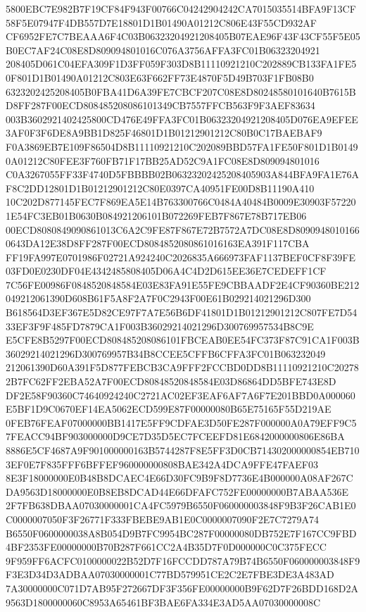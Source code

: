 \documentclass[UTF8,fontset=fandol,zihao=-4,a4paper]{ctexart}
\begin{document}
{{5800EBC7E982B7F19CF84F943F00766C04242904242CA7015035514BFA9F13CF58F5E07947F4DB557D7E18801D1B01490A01212C806E43F55CD932AF
CF6952FE7C7BEAAA6F4C03B06323204921208405B07EAE96F43F43CF55F5E05B0EC7AF24C08E8D809094801016C076A3756AFFA3FC01B06323204921
208405D061C04EFA309F1D3FF059F303D8B11110921210C202889CB133FA1FE50F801D1B01490A01212C803E63F662FF73E4870F5D49B703F1FB08B0
6323202425208405B0FBA41D6A39FE7CBCF207C08E8D80248580101640B7615BD8FF287F00ECD808485208086101349CB7557FFCB563F9F3AEF83634
003B3602921402425800CD476E49FFA3FC01B06323204921208405D076EA9EFEE3AF0F3F6DE8A9BB1D825F46801D1B01212901212C80B0C17BAEBAF9
F0A3869EB7E109F86504D8B11110921210C202089BBD57FA1FE50F801D1B01490A01212C80FEE3F760FB71F17BB25AD52C9A1FC08E8D809094801016
C0A3267055FF33F4740D5FBBBB02B06323202425208405903A844BFA9FA1E76AF8C2DD12801D1B01212901212C80E0397CA40951FE00D8B11190A410
10C202D877145FEC7F869EA5E14B763300766C0484A40484B0009E30903F572201E54FC3EB01B0630B084921206101B072269FEB7F867E78B717EB06
00ECD8080849090861013C6A2C9FE87F867E72B7572A7DC08E8D80909480101660643DA12E38D8FF287F00ECD8084852080861016163EA391F117CBA
FF19FA997E0701986F02721A924240C2026835A666973FAF1137BEF0CF8F39FE03FD0E0230DF04E4342485808405D06A4C4D2D615EE36E7CEDEFF1CF
7C56FE00986F0848520848584E03E83FA91E55FE9CBBAADF2E4CF90360BE212049212061390D608B61F5A8F2A7F0C2943F00E61B029214021296D300
B618564D3EF367E5D82CE97F7A7E56B6DF41801D1B01212901212C807FE7D5433EF3F9F485FD7879CA1F003B36029214021296D300769957534B8C9E
E5CFE8B5297F00ECD808485208086101FBCEAB0EE54FC373F87C91CA1F003B36029214021296D300769957B34B8CCEE5CFFB6CFFA3FC01B063232049
212061390D60A391F5D877FEBCB3CA9FFF2FCCBD0DD8B11110921210C202782B7FC62FF2EBA52A7F00ECD80848520848584E03D86864DD5BFE743E8D
DF2E58F90360C74640924240C2721AC02EF3EAF6AF7A6F7E201BBD0A000060E5BF1D9C0670EF14EA5062ECD599E87F00000080B65E75165F55D219AE
0FEB76FEAF07000000BB1417E5FF9CDFAE3D50FE287F000000A0A79EFF9C57FEACC94BF903000000D9CE7D35D5EC7FCEEFD81E6842000000806E86BA
8886E5CF4687A9F901000000163B5744287F8E5FF3D0CB714302000000854EB7103EF0E7F835FFF6BFFEF960000000808BAE342A4DCA9FFE47FAEF03
8E3F18000000E0B48B8DCAEC4E66D30FC9B9F8D7736E4B000000A08AF267CDA9563D18000000E0B8EB8DCAD44E66DFAFC752FE00000000B7ABAA536E
2F7FB638DBAA07030000001CA4FC5979B6550F060000003848F9B3F26CAB1E0C0000007050F3F26771F333FBEBE9AB1E0C0000007090F2E7C7279A74
B6550F0600000038A8B054D9B7FC9954BC287F00000080DB752E7F167CC9FBD4BF2353FE00000000B70B287F661CC2A4B35D7F0D000000C0C375FECC
9F959FF6ACFC0100000022B52D7F16FCCDD787A79B74B6550F060000003848F9F3E3D34D3ADBAA07030000001C77BD579951CE2C2E7FBE3DE3A483AD
7A30000000C071D7AB95F272667DF3F356FE00000000B9F62D7F26BDD168D2A9563D1800000060C8953A65461BF3BAE6FA334E3AD5AA07030000008C
}}
\end{document}

